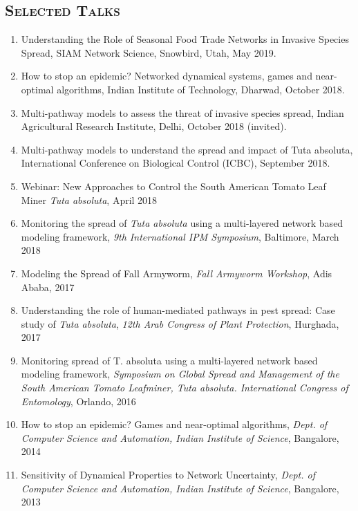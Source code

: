 \documentclass[10pt]{article} %
\begin{document}
\begin{resume}
\section{\textnormal{\textsc{Selected Talks}}} 
\begin{enumerate}[1.]
    \item Understanding the Role of Seasonal Food Trade Networks in Invasive
Species Spread, SIAM Network Science, Snowbird, Utah,
    May 2019.
    \item How to stop an epidemic? Networked dynamical systems, games and
    near-optimal algorithms, Indian Institute of Technology, Dharwad,
    October 2018.
    \item Multi-pathway models to assess the threat of invasive species
    spread, Indian Agricultural Research Institute, Delhi, October 2018
    (invited).
    \item Multi-pathway models to understand the spread and impact of Tuta
    absoluta, International Conference on Biological Control (ICBC),
    September 2018.
   \item Webinar: New Approaches to Control the South American Tomato
   Leaf Miner \emph{Tuta absoluta}, April 2018
   \item Monitoring the spread of {\it Tuta absoluta} using a
    multi-layered network based modeling framework, \emph{9th International
    IPM Symposium}, Baltimore, March 2018
    \item Modeling the Spread of Fall Armyworm, \emph{Fall Armyworm
    Workshop}, Adis Ababa, 2017
    \item Understanding the role of human-mediated pathways in pest spread:
    Case study of \emph{Tuta absoluta}, \emph{12th Arab Congress of Plant
    Protection}, Hurghada, 2017
   \item Monitoring spread of T. absoluta using a multi-layered network
   based modeling framework, \emph{Symposium on Global Spread and Management
   of the South American Tomato Leafminer, Tuta absoluta. International
Congress of Entomology}, Orlando, 2016
\item How to stop an epidemic?  Games and near-optimal algorithms,
\emph{Dept. of Computer Science and Automation, Indian Institute of
Science}, Bangalore, 2014
\item Sensitivity of Dynamical Properties to Network Uncertainty,
\emph{Dept. of Computer Science and Automation, Indian Institute of
Science}, Bangalore, 2013
\end{enumerate}
\iftoggle{compact}{
\section{\textnormal{\textsc{Selected publications}}} 
}{
}
\end{resume}
\end{document}
